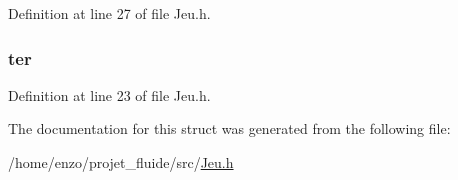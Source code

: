 Definition at line 27 of file Jeu.\-h.

\hypertarget{struct_jeu_ad8002797870fb7f9118f158aa1cba297}{
\subsubsection[{ter}]{ ter}}\label{struct_jeu_ad8002797870fb7f9118f158aa1cba297}


Definition at line 23 of file Jeu.\-h.



The documentation for this struct was generated from the following file\-:\begin{DoxyCompactItemize}
\item 
/home/enzo/projet\-\_\-fluide/src/\hyperlink{_jeu_8h}{Jeu.\-h}\end{DoxyCompactItemize}
